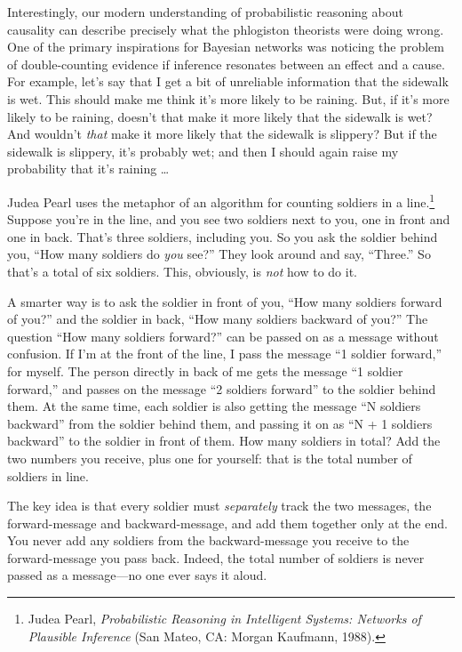 {
 Interestingly, our modern understanding of probabilistic reasoning
about causality can describe precisely what the phlogiston theorists
were doing wrong. One of the primary inspirations for Bayesian networks
was noticing the problem of double-counting evidence if inference
resonates between an effect and a cause. For example,
let's say that I get a bit of unreliable information
that the sidewalk is wet. This should make me think
it's more likely to be raining. But, if
it's more likely to be raining, doesn't
that make it more likely that the sidewalk is wet? And
wouldn't \textit{that} make it more likely that the
sidewalk is slippery? But if the sidewalk is slippery,
it's probably wet; and then I should again raise my
probability that it's raining \ldots}

{
 Judea Pearl uses the metaphor of an algorithm for counting
soldiers in a line.\footnote{Judea Pearl, \textit{Probabilistic Reasoning in Intelligent
Systems: Networks of Plausible Inference} (San Mateo, CA: Morgan
Kaufmann, 1988).} Suppose you're
in the line, and you see two soldiers next to you, one in front and one
in back. That's three soldiers, including you. So you
ask the soldier behind you, ``How many soldiers do
\textit{you} see?'' They look around and say,
``Three.'' So that's
a total of six soldiers. This, obviously, is \textit{not} how to do
it.}

{
 A smarter way is to ask the soldier in front of you,
``How many soldiers forward of
you?'' and the soldier in back,
``How many soldiers backward of
you?'' The question ``How many
soldiers forward?'' can be passed on as a message
without confusion. If I'm at the front of the line, I
pass the message ``1 soldier
forward,'' for myself. The person directly in back of
me gets the message ``1 soldier
forward,'' and passes on the message
``2 soldiers forward'' to the
soldier behind them. At the same time, each soldier is also getting the
message ``N soldiers backward'' from
the soldier behind them, and passing it on as ``N + 1
soldiers backward'' to the soldier in front of them.
How many soldiers in total? Add the two numbers you receive, plus one
for yourself: that is the total number of soldiers in line.}

{
 The key idea is that every soldier must \textit{separately} track
the two messages, the forward-message and backward-message, and add
them together only at the end. You never add any soldiers from the
backward-message you receive to the forward-message you pass back.
Indeed, the total number of soldiers is never passed as a message---no
one ever says it aloud.}

